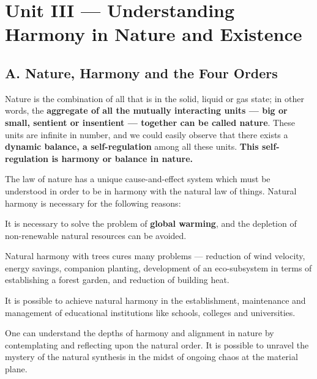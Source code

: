 \chapter{Unit III --- Understanding Harmony in Nature and Existence}

\section{A. Nature, Harmony and the Four Orders}


\ans Nature is the combination of all that is in the solid, liquid or gas
state; in other words, the \textbf{aggregate of all the mutually interacting
units --- big or small, sentient or insentient --- together can be called
nature}. These units are infinite in number, and we could easily observe that
there exists a \textbf{dynamic balance, a self-regulation} among all these
units. \textbf{This self-regulation is harmony or balance in nature.}

The law of nature has a unique cause-and-effect system which must be
understood in order to be in harmony with the natural law of things. Natural
harmony is necessary for the following reasons:

\begin{apts}
\item It is necessary to solve the problem of \textbf{global warming}, and the
      depletion of non-renewable natural resources can be avoided.
\item Natural harmony with trees cures many problems --- reduction of wind
      velocity, energy savings, companion planting, development of an
      eco-subsystem in terms of establishing a forest garden, and reduction of
      building heat.
\item It is possible to achieve natural harmony in the establishment,
      maintenance and management of educational institutions like schools,
      colleges and universities.
\item One can understand the depths of harmony and alignment in nature by
      contemplating and reflecting upon the natural order. It is possible to
      unravel the mystery of the natural synthesis in the midst of ongoing
      chaos at the material plane.
\end{apts}

